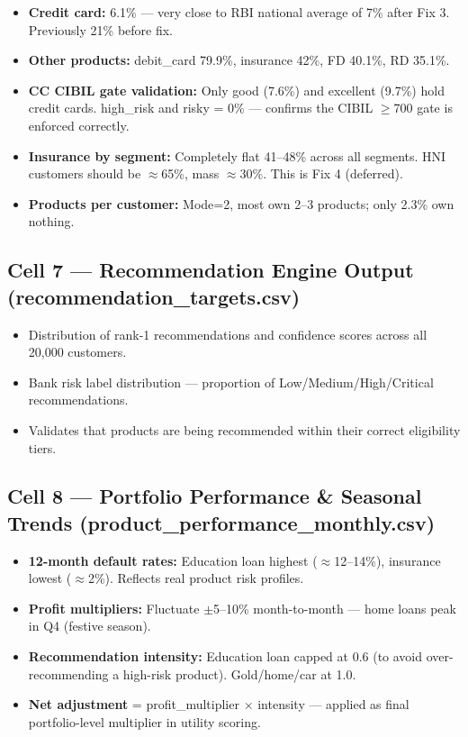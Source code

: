 \documentclass[12pt,a4paper]{article}
\begin{document}
\begin{itemize}[leftmargin=*,itemsep=2pt]
  \item \textbf{Credit card:} 6.1\% — very close to RBI national average of 7\% after Fix 3. Previously 21\% before fix.
  \item \textbf{Other products:} debit\_card 79.9\%, insurance 42\%, FD 40.1\%, RD 35.1\%.
  \item \textbf{CC CIBIL gate validation:} Only good (7.6\%) and excellent (9.7\%) hold credit cards. high\_risk and risky = 0\% — confirms the CIBIL $\geq$700 gate is enforced correctly.
  \item \textbf{Insurance by segment:} Completely flat 41--48\% across all segments. HNI customers should be $\approx$65\%, mass $\approx$30\%. This is Fix 4 (deferred).
  \item \textbf{Products per customer:} Mode=2, most own 2--3 products; only 2.3\% own nothing.
\end{itemize}

\subsection{Cell 7 — Recommendation Engine Output (recommendation\_targets.csv)}

\begin{itemize}[leftmargin=*,itemsep=2pt]
  \item Distribution of rank-1 recommendations and confidence scores across all 20{,}000 customers.
  \item Bank risk label distribution — proportion of Low/Medium/High/Critical recommendations.
  \item Validates that products are being recommended within their correct eligibility tiers.
\end{itemize}

\subsection{Cell 8 — Portfolio Performance \& Seasonal Trends (product\_performance\_monthly.csv)}

\begin{itemize}[leftmargin=*,itemsep=2pt]
  \item \textbf{12-month default rates:} Education loan highest ($\approx$12--14\%), insurance lowest ($\approx$2\%). Reflects real product risk profiles.
  \item \textbf{Profit multipliers:} Fluctuate $\pm$5--10\% month-to-month — home loans peak in Q4 (festive season).
  \item \textbf{Recommendation intensity:} Education loan capped at 0.6 (to avoid over-recommending a high-risk product). Gold/home/car at 1.0.
  \item \textbf{Net adjustment} = profit\_multiplier $\times$ intensity — applied as final portfolio-level multiplier in utility scoring.
\end{itemize}
\end{document}
